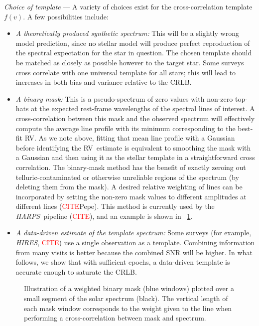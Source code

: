\documentclass[modern]{aastex631}
\renewcommand{\paragraph}[1]{\bigskip\par\noindent\textsl{#1} ---}
\newcommand{\todo}[1]{\textcolor{red}{#1}}  %
\newcommand{\CITE}{\todo{CITE}}
\newcommand{\acronym}[1]{{\small{#1}}}
\newcommand{\project}[1]{\textsl{#1}}
\newcommand{\HARPS}{\project{\acronym{HARPS}}}
\newcommand{\HIRES}{\project{\acronym{HIRES}}}
\newcommand{\RV}{\acronym{RV}}
\newcommand{\CRLB}{\acronym{CRLB}}
\begin{document}
\paragraph{Choice of template}
A variety of choices exist for the cross-correlation template
$f(v)$. A few possibilities include:
\begin{itemize}
\item \emph{A theoretically produced synthetic spectrum:}
  This will be a slightly wrong model prediction,
  since no stellar model will produce perfect reproduction of the
  spectral expectation for the star in question.
  The chosen template should be matched as closely as possible however
  to the target star. Some surveys cross correlate with one universal
  template for all stars; this will lead to increases in both bias and
  variance relative to the \CRLB.
\item \emph{A binary mask:}
  This is a pseudo-spectrum of zero values with non-zero top-hats at the
  expected rest-frame wavelengths of the spectral lines of interest.
  A cross-correlation between this mask and the observed spectrum will
  effectively compute the average line profile with its minimum
  corresponding to the best-fit RV.
  As we note above, fitting that mean line profile with a Gaussian
  before identifying the \RV\ estimate is equivalent to smoothing the
  mask with a Gaussian and then using it as the stellar template in a
  straightforward cross correlation.
  The binary-mask method has the benefit of exactly zeroing out
  telluric-contaminated or otherwise unreliable regions of the
  spectrum (by deleting them from the mask).
  A desired relative weighting of lines can be incorporated by setting
  the non-zero mask values to different amplitudes at different lines
  (\CITE Pepe). This method is currently used by the \HARPS\ pipeline
  (\CITE), and an example is shown in \figurename~\ref{fig:binarymask}.
\item \emph{A data-driven estimate of the template spectrum:}
  Some surveys (for example, \HIRES, \CITE) use a single observation as a
  template.
  Combining information from many visits is better because the
  combined SNR will be higher.
  In what follows, we show that with sufficient epochs, a data-driven
  template is accurate enough to saturate the \CRLB.
\end{itemize}
\begin{figure}[htp]
\centering
\caption{Illustration of a weighted binary mask (blue windows) plotted over a small segment of the solar spectrum (black). The vertical length of each mask window corresponds to the weight given to the line when performing a cross-correlation between mask and spectrum.}
\label{fig:binarymask}
\end{figure}
\end{document}
